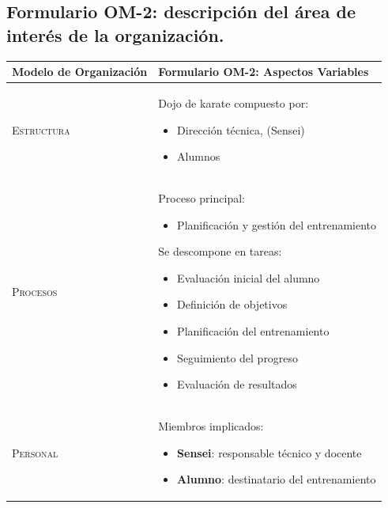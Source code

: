\documentclass[12pt,a4paper,twoside,spanish]{article}      %
\begin{document}
            
            \pagebreak
            
        \subsection{Formulario OM-2: descripción del área de interés de la organización.}

            

            \begin{table}[H]
            \scriptsize
                \begin{tabularx}{\textwidth}{|l|X|} \hline
                    \textbf{Modelo de Organización} & \textbf{Formulario OM-2: Aspectos Variables} \\ \hline\hline
                    
                    \textsc{Estructura} & 
                    Dojo de karate compuesto por:
                    \begin{itemize}
                        \item Dirección técnica, (Sensei)
                        \item Alumnos
                    \end{itemize} \\ \hline
                    
                    \textsc{Procesos} & 
                    Proceso principal:
                    \begin{itemize}
                        \item Planificación y gestión del entrenamiento
                    \end{itemize}
                    
                    Se descompone en tareas:
                    \begin{itemize}
                        \item Evaluación inicial del alumno
                        \item Definición de objetivos
                        \item Planificación del entrenamiento
                        \item Seguimiento del progreso
                        \item Evaluación de resultados
                    \end{itemize} \\ \hline
                    
                    \textsc{Personal} &  
                    Miembros implicados:
                    \begin{itemize}
                        \item \textbf{Sensei}: responsable técnico y docente
                        \item \textbf{Alumno}: destinatario del entrenamiento
                    \end{itemize} \\ \hline
                    

\end{tabularx}
\end{table}
\end{document}
